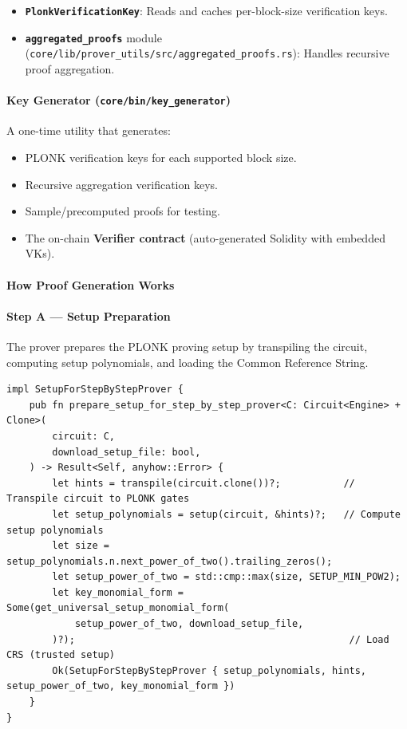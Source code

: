 \begin{itemize}
    \item \textbf{\texttt{PlonkVerificationKey}}: Reads and caches per-block-size verification keys.
    \item \textbf{\texttt{aggregated\_proofs}} module (\texttt{core/lib/prover\_utils/src/aggregated\_proofs.rs}): Handles recursive proof aggregation.
\end{itemize}

\paragraph{Key Generator (\texttt{core/bin/key\_generator})}

A one-time utility that generates:

\begin{itemize}
    \item PLONK verification keys for each supported block size.
    \item Recursive aggregation verification keys.
    \item Sample/precomputed proofs for testing.
    \item The on-chain \textbf{Verifier contract} (auto-generated Solidity with embedded VKs).
\end{itemize}

\paragraph{How Proof Generation Works}
\paragraph{Step A --- Setup Preparation}

The prover prepares the PLONK proving setup by transpiling the circuit, computing setup polynomials, and loading the Common Reference String.


\begin{lstlisting}[caption={Setup preparation from \texttt{core/lib/prover\_utils/src/lib.rs}}]
impl SetupForStepByStepProver {
    pub fn prepare_setup_for_step_by_step_prover<C: Circuit<Engine> + Clone>(
        circuit: C,
        download_setup_file: bool,
    ) -> Result<Self, anyhow::Error> {
        let hints = transpile(circuit.clone())?;           // Transpile circuit to PLONK gates
        let setup_polynomials = setup(circuit, &hints)?;   // Compute setup polynomials
        let size = setup_polynomials.n.next_power_of_two().trailing_zeros();
        let setup_power_of_two = std::cmp::max(size, SETUP_MIN_POW2);
        let key_monomial_form = Some(get_universal_setup_monomial_form(
            setup_power_of_two, download_setup_file,
        )?);                                                // Load CRS (trusted setup)
        Ok(SetupForStepByStepProver { setup_polynomials, hints, setup_power_of_two, key_monomial_form })
    }
}
\end{lstlisting}

